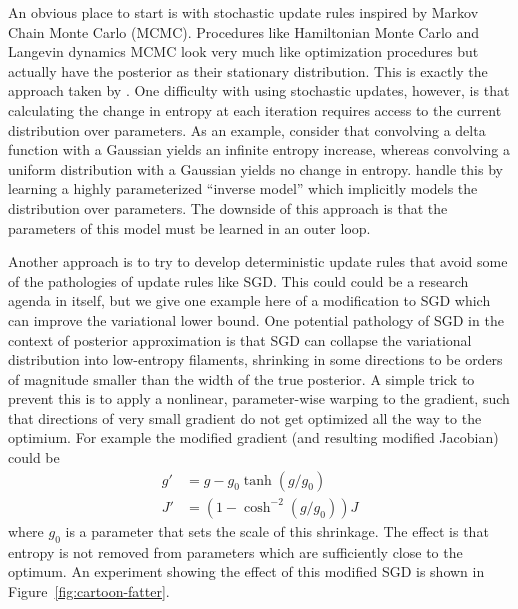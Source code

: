 \documentclass[]{article}
\begin{document}
An obvious place to start is with stochastic update rules inspired by Markov Chain Monte Carlo (MCMC). 
Procedures like Hamiltonian Monte Carlo \citep{neal2011mcmc} and Langevin dynamics MCMC \citep{welling2011bayesian} look very much like optimization procedures but actually have the posterior as their stationary distribution.
This is exactly the approach taken by \citet{Bridging14}.
One difficulty with using stochastic updates, however, is that calculating the change in
entropy at each iteration requires access to the current distribution over parameters.
As an example, consider that convolving a delta function with a Gaussian yields an
infinite entropy increase, whereas convolving a uniform distribution with a Gaussian
yields no change in entropy. \citet{welling2011bayesian} handle this
by learning a highly parameterized ``inverse model'' which implicitly models the distribution
over parameters. The downside of this approach is that the parameters of this model must be learned in an outer loop.

Another approach is to try to develop deterministic update rules
that avoid some of the pathologies of update rules like SGD.
This could could be a research agenda in itself, but we give one example here of a modification to
SGD which can improve the variational lower bound.
One potential pathology of SGD in the context of posterior approximation is that
SGD can collapse the variational distribution into low-entropy filaments, shrinking in some directions to be orders of magnitude smaller than the width of the true posterior.
A simple trick to prevent this is to apply a nonlinear, parameter-wise warping
to the gradient, such that directions of very small gradient do not get optimized all the way
to the optimium. For example the modified gradient (and resulting modified
Jacobian) could be
\begin{align}
g' & = g - g_0 \tanh \left(g / g_0 \right) \nonumber \\
J' & = \left(1 - \cosh^{-2} (g / g_0) \right) J  \nonumber 
\end{align}
where $g_0$ is a parameter that sets the scale of this shrinkage.
The effect is that entropy is not removed from parameters which are sufficiently close to the optimum. An experiment showing the effect of this modified SGD is shown in Figure~\ref{fig:cartoon-fatter}.
\end{document}
